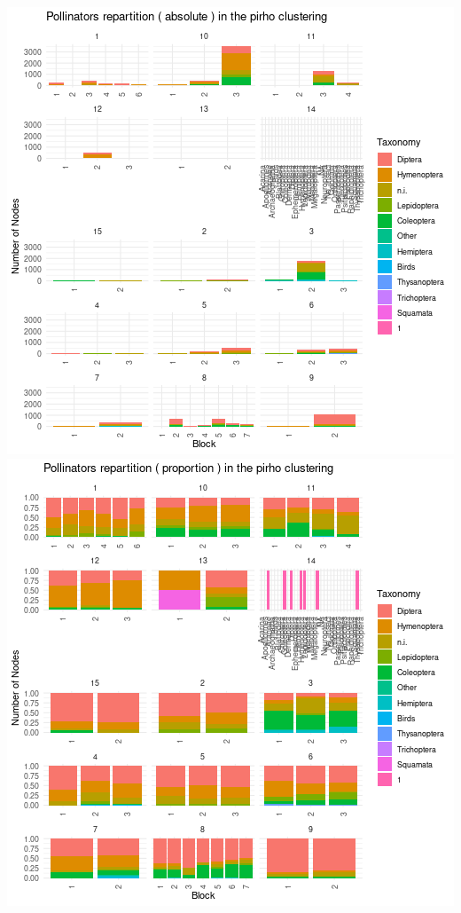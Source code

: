 \includegraphics{./img/337973465a11f78731e92a7e62b1f4c2164ab43e.png}\includegraphics{./img/09bed9592345eff7f0e23841c310114fc4b5773d.png}

